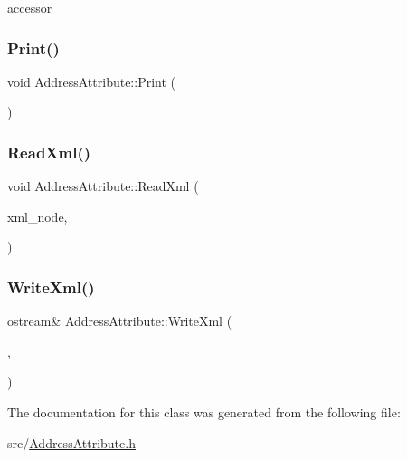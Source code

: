 accessor \mbox{\label{classAddressAttribute_a862ec35a0100f0486d466eac3cdb1cc3}} 
\subsubsection{\texorpdfstring{Print()}{Print()}}
{\footnotesize\ttfamily void Address\+Attribute\+::\+Print (\begin{DoxyParamCaption}\item[{std\+::ostream \&}]{ }\end{DoxyParamCaption})}

\mbox{\label{classAddressAttribute_a08871197b24a886864a337896ebab051}} 
\subsubsection{\texorpdfstring{Read\+Xml()}{ReadXml()}}
{\footnotesize\ttfamily void Address\+Attribute\+::\+Read\+Xml (\begin{DoxyParamCaption}\item[{Xml\+Tag const $\ast$}]{xml\+\_\+node,  }\item[{cfglib\+::\+Handle \&}]{ }\end{DoxyParamCaption})}

\mbox{\label{classAddressAttribute_ad189a02a8d2bc9058cd35bebf3f1210f}} 
\subsubsection{\texorpdfstring{Write\+Xml()}{WriteXml()}}
{\footnotesize\ttfamily ostream\& Address\+Attribute\+::\+Write\+Xml (\begin{DoxyParamCaption}\item[{std\+::ostream \&}]{,  }\item[{cfglib\+::\+Handle \&}]{ }\end{DoxyParamCaption})}



The documentation for this class was generated from the following file\+:\begin{DoxyCompactItemize}
\item 
src/\hyperlink{AddressAttribute_8h}{Address\+Attribute.\+h}\end{DoxyCompactItemize}
